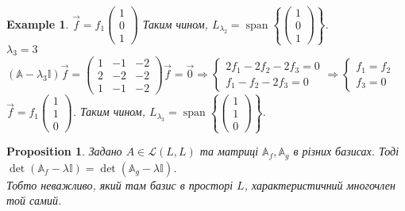 \documentclass[a4paper, 10pt]{article}
\theoremstyle{theoremdd}
\newtheorem{example}[theorem]{Example}
\newtheorem{proposition}[theorem]{Proposition}
\DeclareMathOperator{\linspan}{span}
\begin{document}
\begin{example}
$\vec{f} = f_1 \begin{pmatrix}
1 \\ 0 \\ 1
\end{pmatrix}$ Таким чином, $L_{\lambda_2} = \linspan\left\{ \begin{pmatrix}
1 \\ 0 \\ 1
\end{pmatrix} \right\}$.
\bigskip \\
$\lambda_3 = 3$\\
$(\mathbb{A} - \lambda_3 \mathbb{I})\vec{f} =\begin{pmatrix}
1 & -1 & -2 \\
2 & -2 & -2 \\
1 & -1 & -2
\end{pmatrix} \vec{f} = \vec{0} \Rightarrow \begin{cases} 2f_1 - 2f_2 - 2f_3 = 0 \\ f_1 - f_2 - 2f_3 = 0 \end{cases} \Rightarrow \begin{cases} f_1 = f_2 \\ f_3 = 0 \end{cases}$\\
$\vec{f} = f_1 \begin{pmatrix}
1 \\ 1 \\ 0
\end{pmatrix}$. Таким чином, $L_{\lambda_3} = \linspan\left\{ \begin{pmatrix}
1 \\ 1 \\ 0
\end{pmatrix} \right\}$.
\end{example}

\begin{proposition}
\label{change_of_basis_characteristic_polynomial}
Задано $A \in \mathcal{L}(L,L)$ та матриці $\mathbb{A}_f, \mathbb{A}_g$ в різних базисах. Тоді $\det(\mathbb{A}_f - \lambda \mathbb{I}) = \det(\mathbb{A}_g - \lambda \mathbb{I})$.\\
Тобто неважливо, який там базис в просторі $L$, характеристичний многочлен той самий.
\end{proposition}
\end{document}
